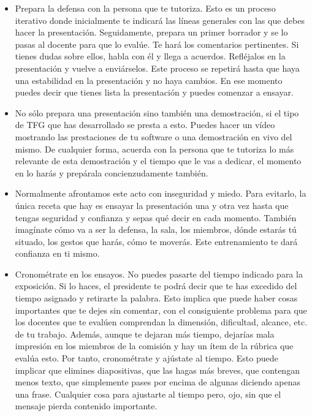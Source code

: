 \begin{itemize}

    \item Prepara la defensa con la persona que te tutoriza. Esto es un proceso iterativo donde inicialmente te indicará las líneas generales con las que debes hacer la presentación. Seguidamente, prepara un primer borrador y se lo pasas al docente para que lo evalúe. Te hará los comentarios pertinentes. Si tienes dudas sobre ellos, habla con él y llega a acuerdos. Refléjalos en la presentación y vuelve a enviárselos. Este proceso se repetirá hasta que haya una estabilidad en la presentación y no haya cambios. En ese momento puedes decir que tienes lista la presentación y puedes comenzar a ensayar.

    \item No sólo prepara una presentación sino también una demostración, si el tipo de TFG que has desarrollado se presta a esto. Puedes hacer un vídeo mostrando las prestaciones de tu software o una demostración en vivo del mismo. De cualquier forma, acuerda con la persona que te tutoriza lo más relevante de esta demostración y el tiempo que le vas a dedicar, el momento en lo harás y prepárala concienzudamente también. 

    \item Normalmente afrontamos este acto con inseguridad y miedo. Para evitarlo, la única receta que hay es ensayar la presentación una y otra vez hasta que tengas seguridad y confianza y sepas qué decir en cada momento. También imagínate cómo va a ser la defensa, la sala, los miembros, dónde estarás tú situado, los gestos que harás, cómo te moverás. Este entrenamiento te dará confianza en ti mismo.

    \item Cronométrate en los ensayos. No puedes pasarte del tiempo indicado para la exposición. Si lo haces, el presidente te podrá decir que te has excedido del tiempo asignado y retirarte la palabra. Esto implica que puede haber cosas importantes que te dejes sin comentar, con el consiguiente problema para que los docentes que te evalúen comprendan la dimensión, dificultad, alcance, etc. de tu trabajo. Además, aunque te dejaran más tiempo, dejarías mala impresión en los miembros de la comisión y hay un ítem de la rúbrica que evalúa esto. Por tanto, cronométrate y ajústate al tiempo. Esto puede implicar que elimines diapositivas, que las hagas más breves, que contengan menos texto, que simplemente pases por encima de algunas diciendo apenas una frase. Cualquier cosa para ajustarte al tiempo pero, ojo, sin que el mensaje pierda contenido importante.


\end{itemize}
